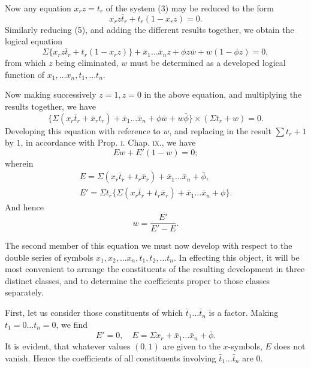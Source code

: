 \documentclass[oneside]{book}
\begin{document}
Now any equation $x_r z = t_r$ of the system (3) may be reduced
to the form
\begin{equation*}
x_r z \bar{t}_r + t_r(1-x_r z)=0.
\end{equation*}
Similarly reducing (5), and adding the different results together,
we obtain the logical equation
\[
  \Sigma \{x_rz\bar{t}_r + t_r(1-x_rz)\}
+ \bar{x}_1\dotsc \bar{x}_nz + \phi z\bar{w} + w(1-\phi z) = 0, \tag{7}
\]
from which $z$ being eliminated, $w$ must be determined as a developed logical function of $x_1,\dotsc x_n, t_1,\dotsc t_n$.

Now making successively $z = 1, z = 0$ in the above equation,
and multiplying the results together, we have
\[
  \{\Sigma (x_r\bar{t}_r + \bar{x}_rt_r)
+ \bar{x}_1\dotsc \bar{x}_n + \phi\bar{w} + w\bar{\phi}\}
  \times (\Sigma t_r + w) = 0.
\]
Developing this equation with reference to $w$, and replacing
in the result $\sum t_r + 1$ by $1$, in accordance with Prop. \textsc{i.} Chap. \textsc{ix.},
we have
\[
  Ew + E'(1-w) = 0;
\]
wherein
\begin{gather*}
  E = \Sigma (x_r\bar{t}_r + t_r\bar{x}_r)
    + \bar{x}_1 \dotsc \bar{x}_n + \bar{\phi},   \\
  E'= \Sigma t_r \{ \Sigma (x_r\bar{t}_r + t_r\bar{x}_r)
    + \bar{x}_1 \dotsc \bar{x}_n + \phi \}.
\end{gather*}
And hence
\[
  w = \frac{E'}{E'-E}. \tag{8}
\]

The second member of this equation we must now develop
with respect to the double series of symbols
$x_1, x_2,\dotsc x_n, t_1, t_2,\dotsc t_n$.
In effecting this object, it will be most convenient to arrange
the constituents of the resulting development in three distinct
classes, and to determine the coefficients proper to those classes
separately.

First, let us consider those constituents of which
$\bar{t}_1 \dotsc \bar{t}_n$ is a
factor. Making $t_1 = 0 \dotsc t_n = 0$, we find
\[
  E' = 0,\quad E = \Sigma x_r + \bar{x}_1 \dotsc \bar{x}_n + \bar{\phi}.
\]
It is evident, that whatever values $(0, 1)$ are given to the $x$-symbols, $E$ does not vanish. Hence the coefficients of all constituents
involving $\bar{t}_1 \dotsc \bar{t}_n$ are $0$.
\end{document}
